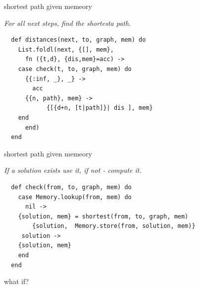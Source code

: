 \begin{frame}[fragile]{shortest path given memeory}

\pause\vspace{10pt}

{\em For all next steps, find the shortesta path.}

\pause\vspace{10pt}

\begin{verbatim}
  def distances(next, to, graph, mem) do
    List.foldl(next, {[], mem},
      fn ({t,d}, {dis,mem}=acc) ->
	case check(t, to, graph, mem) do
	  {{:inf, _}, _} ->
	    acc
	  {{n, path}, mem} ->
            {[{d+n, [t|path]}| dis ], mem}
	end
      end)
  end
\end{verbatim}
\end{frame}

\begin{frame}[fragile]{shortest path given memeory}

{\em If a solution exists use it, if not - compute it.}

\begin{verbatim}
  def check(from, to, graph, mem) do
    case Memory.lookup(from, mem) do
      nil ->
	{solution, mem} = shortest(from, to, graph, mem)
        {solution,  Memory.store(from, solution, mem)}
     solution ->
	{solution, mem}
    end
  end
\end{verbatim}
\end{frame}



\begin{frame}{what if?}

\begin{figure}
\end{figure}

\end{frame}

